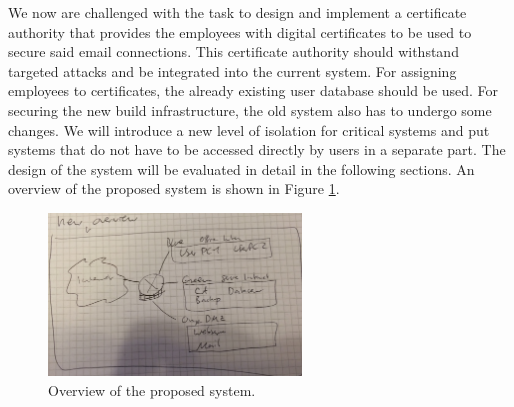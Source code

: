\documentclass[a4paper, toc=index, 12pt, DIV14, twoside, BCOR2cm, headsepline, numbers=noenddot, bibliography=totoc]{scrbook}
\begin{document}
We now are challenged with the task to design and implement a certificate authority that provides the employees with digital certificates to be used to secure said email connections.\newline
This certificate authority should withstand targeted attacks and be integrated into the current system. For assigning employees to certificates, the already existing user database should be used. For securing the new build infrastructure, the old system also has to undergo some changes. We will introduce a new level of isolation for critical systems and put systems that do not have to be accessed directly by users in a separate part. The design of the system will be evaluated in detail in the following sections. An overview of the proposed system is shown in Figure \ref{newoverview}.
\begin{figure}[H]
  \centering
    \includegraphics[width=0.6\textwidth]{images/newoverview.jpg}  
  \caption{Overview of the proposed system.}
  \label{newoverview}
\end{figure}
\end{document}
